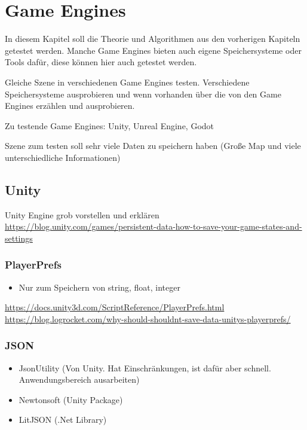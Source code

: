 \chapter{Game Engines}\label{ch:gameengines}
In diesem Kapitel soll die Theorie und Algorithmen aus den vorherigen Kapiteln 
getestet werden. Manche Game Engines bieten auch eigene Speichersysteme oder
Tools dafür, diese können hier auch getestet werden.

Gleiche Szene in verschiedenen Game Engines testen. 
Verschiedene Speichersysteme ausprobieren und wenn vorhanden über die von den Game Engines erzählen und ausprobieren.

Zu testende Game Engines: Unity, Unreal Engine, Godot

Szene zum testen soll sehr viele Daten zu speichern haben (Große Map und viele unterschiedliche Informationen)


\section{Unity}
Unity Engine grob vorstellen und erklären
\url{https://blog.unity.com/games/persistent-data-how-to-save-your-game-states-and-settings}


\subsection{PlayerPrefs}
\begin{itemize}
    \item Nur zum Speichern von string, float, integer
\end{itemize}

\url{https://docs.unity3d.com/ScriptReference/PlayerPrefs.html}\\
\url{https://blog.logrocket.com/why-should-shouldnt-save-data-unitys-playerprefs/}

\subsection{JSON}
\begin{itemize}
    \item JsonUtility (Von Unity. Hat Einschränkungen, ist dafür aber schnell. Anwendungsbereich ausarbeiten)
    \item Newtonsoft (Unity Package)
    \item LitJSON (.Net Library)
\end{itemize}

